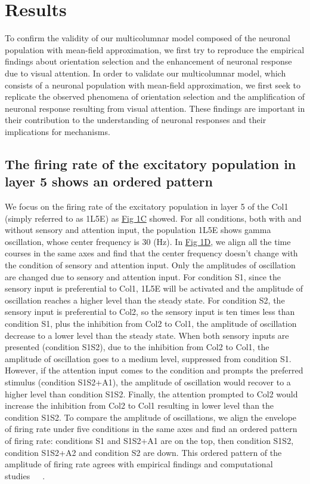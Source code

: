 \documentclass[10pt,letterpaper]{article}
\begin{document}
\section*{Results}
To confirm the validity of our multicolumnar model composed of the neuronal population with mean-field approximation, we first try to reproduce the empirical findings about orientation selection and the enhancement of neuronal response due to visual attention.
In order to validate our multicolumnar model, which consists of a neuronal population with mean-field approximation, we first seek to replicate the observed phenomena of orientation selection and the amplification of neuronal response resulting from visual attention. These findings are important in their contribution to the understanding of neuronal responses and their implications for mechanisms.

\subsection*{The firing rate of the excitatory population in layer 5 shows an ordered pattern}
We focus on the firing rate of the excitatory population in layer 5 of the Col1 (simply referred to as 1L5E) as \hyperlink{fig:fig1}{Fig 1C} showed. For all conditions, both with and without sensory and attention input, the population 1L5E shows gamma oscillation, whose center frequency is 30 (Hz). In \hyperlink{fig:fig1}{Fig 1D}, we align all the time courses in the same axes and find that the center frequency doesn't change with the condition of sensory and attention input. Only the amplitudes of oscillation are changed due to sensory and attention input. For condition S1, since the sensory input is preferential to Col1, 1L5E will be activated and the amplitude of oscillation reaches a higher level than the steady state. For condition S2, the sensory input is preferential to Col2, so the sensory input is ten times less than condition S1, plus the inhibition from Col2 to Col1, the amplitude of oscillation decrease to a lower level than the steady state. When both sensory inputs are presented (condition S1S2), due to the inhibition from Col2 to Col1, the amplitude of oscillation goes to a medium level, suppressed from condition S1. However, if the attention input comes to the condition and prompts the preferred stimulus (condition S1S2+A1), the amplitude of oscillation would recover to a higher level than condition S1S2. Finally, the attention prompted to Col2 would increase the inhibition from Col2 to Col1 resulting in lower level than the condition S1S2. To compare the amplitude of oscillations, we align the envelope of firing rate under five conditions in the same axes and find an ordered pattern of firing rate: conditions S1 and S1S2+A1 are on the top, then condition S1S2, condition S1S2+A2 and condition S2 are down. This ordered pattern of the amplitude of firing rate agrees with empirical findings and computational studies~\cite{luck1997}~\cite{reynolds1999}~\cite{wagatsuma2011}.
\end{document}
